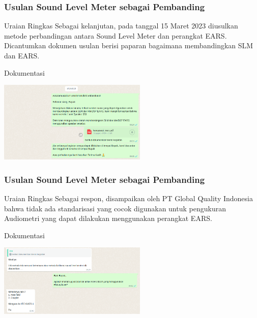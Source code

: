 \documentclass[table,dvipsnames]{beamer}
\begin{document}
	\begin{frame}
		\frametitle{Usulan Sound Level Meter sebagai Pembanding}

		\begin{exampleblock}{Uraian Ringkas}
			Sebagai kelanjutan, pada tanggal 15 Maret 2023 diusulkan metode perbandingan antara Sound Level Meter dan perangkat EARS.
			Dicantumkan dokumen usulan berisi paparan bagaimana membandingkan SLM dan EARS.
		\end{exampleblock}

		\begin{exampleblock}{Dokumentasi}
			\begin{center}
				\includegraphics[width=200pt]{images/doc3}
			\end{center}
		\end{exampleblock}
	\end{frame}

	\begin{frame}
		\frametitle{Usulan Sound Level Meter sebagai Pembanding}

		\begin{exampleblock}{Uraian Ringkas}
			Sebagai respon, disampaikan oleh PT Global Quality Indonesia bahwa tidak ada standarisasi yang cocok digunakan untuk
			pengukuran Audiometri yang dapat dilakukan menggunakan perangkat EARS.
		\end{exampleblock}

		\begin{exampleblock}{Dokumentasi}
			\begin{center}
				\includegraphics[width=200pt]{images/doc4}
			\end{center}
		\end{exampleblock}
	\end{frame}
\end{document}
